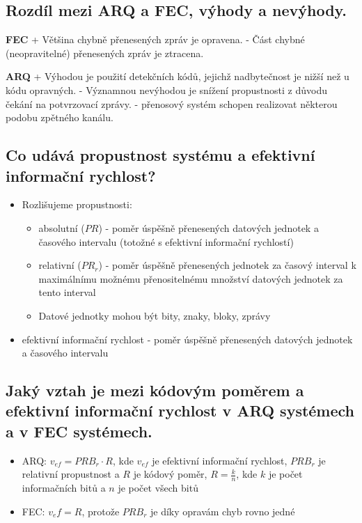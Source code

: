 \subsection{Rozdíl mezi ARQ a FEC, výhody a nevýhody.}
\textbf{FEC} + Většina chybně přenesených zpráv je opravena. - Část chybné (neopravitelné) přenesených zpráv je ztracena. 

\textbf{ARQ} + Výhodou je použití detekčních kódů, jejichž nadbytečnost je nižší než u kódu opravných. - Významnou nevýhodou je snížení propustnosti z důvodu čekání na potvrzovací zprávy. - přenosový systém schopen realizovat některou podobu zpětného kanálu.

\subsection{Co udává propustnost systému a efektivní informační rychlost?}
\begin{itemize}
    \item Rozlišujeme propustnosti:
    \begin{itemize}
        \item absolutní ($PR$) - poměr úspěšně přenesených datových jednotek a časového intervalu 
        (totožné s efektivní informační rychlostí)
        \item relativní ($PR_r$) - poměr úspěšně přenesených jednotek za časový interval k maximálnímu
        možnému přenositelnému množství datových jednotek za tento interval
        \item Datové jednotky mohou být bity, znaky, bloky, zprávy
    \end{itemize}
    \item efektivní informační rychlost - poměr úspěšně přenesených datových jednotek a časového intervalu 
\end{itemize}

\subsection{Jaký vztah je mezi kódovým poměrem a efektivní informační rychlost v ARQ systémech a
v FEC systémech.}
\begin{itemize}
    \item ARQ: $v_{ef}=PRB_r\cdot R$, kde $v_{ef}$ je efektivní informační rychlost, $PRB_r$ je relativní propustnost
    a $R$ je kódový poměr, $R=\frac{k}{n}$, kde $k$ je počet informačních bitů a $n$ je počet všech bitů
    \item FEC: $v_ef=R$, protože $PRB_r$ je díky opravám chyb rovno jedné
\end{itemize}

